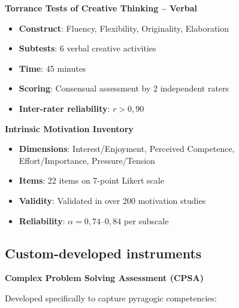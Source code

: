 \textbf{Torrance Tests of Creative Thinking -- Verbal}
\begin{itemize}
	\item \textbf{Construct}: Fluency, Flexibility, Originality, Elaboration
	\item \textbf{Subtests}: 6 verbal creative activities
	\item \textbf{Time}: 45 minutes
	\item \textbf{Scoring}: Consensual assessment by 2 independent raters
	\item \textbf{Inter-rater reliability}: $r > 0{,}90$
\end{itemize}

\textbf{Intrinsic Motivation Inventory}
\begin{itemize}
	\item \textbf{Dimensions}: Interest/Enjoyment, Perceived Competence, Effort/Importance, Pressure/Tension
	\item \textbf{Items}: 22 items on 7-point Likert scale
	\item \textbf{Validity}: Validated in over 200 motivation studies
	\item \textbf{Reliability}: $\alpha = 0{,}74$--$0{,}84$ per subscale
\end{itemize}

\subsection{Custom-developed instruments}

\textbf{Complex Problem Solving Assessment (CPSA)}

Developed specifically to capture pyragogic competencies:

